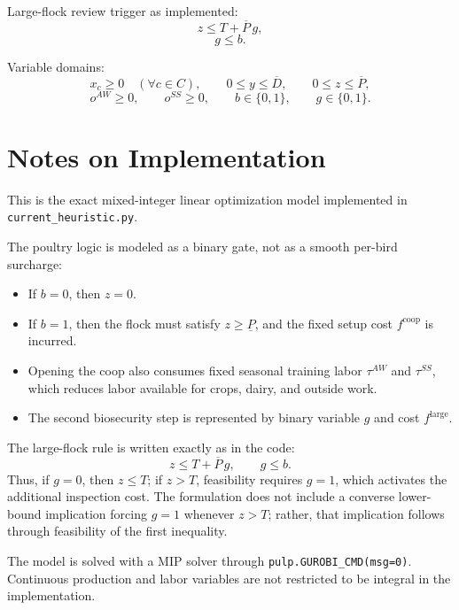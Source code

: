 Large-flock review trigger as implemented:
\[
z \le T + \overline P\, g,
\]
\[
g \le b.
\]

Variable domains:
\[
x_c \ge 0 \quad (\forall c\in C), \qquad
0 \le y \le \overline D, \qquad
0 \le z \le \overline P,
\]
\[
o^{AW}\ge 0,\qquad o^{SS}\ge 0,\qquad
b\in\{0,1\},\qquad g\in\{0,1\}.
\]

\section*{Notes on Implementation}

This is the exact mixed-integer linear optimization model implemented in \texttt{current\_heuristic.py}.

The poultry logic is modeled as a binary gate, not as a smooth per-bird surcharge:
\begin{itemize}
\item If \(b=0\), then \(z=0\).
\item If \(b=1\), then the flock must satisfy \(z\ge \underline P\), and the fixed setup cost \(f^{\text{coop}}\) is incurred.
\item Opening the coop also consumes fixed seasonal training labor \(\tau^{AW}\) and \(\tau^{SS}\), which reduces labor available for crops, dairy, and outside work.
\item The second biosecurity step is represented by binary variable \(g\) and cost \(f^{\text{large}}\).
\end{itemize}

The large-flock rule is written exactly as in the code:
\[
z \le T + \overline P\, g,\qquad g \le b.
\]
Thus, if \(g=0\), then \(z\le T\); if \(z>T\), feasibility requires \(g=1\), which activates the additional inspection cost. The formulation does not include a converse lower-bound implication forcing \(g=1\) whenever \(z>T\); rather, that implication follows through feasibility of the first inequality.

The model is solved with a MIP solver through \texttt{pulp.GUROBI\_CMD(msg=0)}. Continuous production and labor variables are not restricted to be integral in the implementation.
